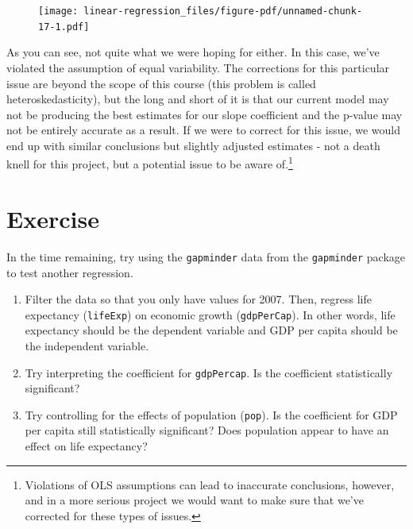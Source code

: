 \documentclass[
  letterpaper,
]{book}
\begin{document}
\begin{figure}[H]

{\centering \texttt{[image: linear-regression\_files/figure-pdf/unnamed-chunk-17-1.pdf]}

}

\end{figure}

As you can see, not quite what we were hoping for either. In this case,
we've violated the assumption of equal variability. The corrections for
this particular issue are beyond the scope of this course (this problem
is called heteroskedasticity), but the long and short of it is that our
current model may not be producing the best estimates for our slope
coefficient and the p-value may not be entirely accurate as a result. If
we were to correct for this issue, we would end up with similar
conclusions but slightly adjusted estimates - not a death knell for this
project, but a potential issue to be aware of.\footnote{Violations of
  OLS assumptions can lead to inaccurate conclusions, however, and in a
  more serious project we would want to make sure that we've corrected
  for these types of issues.}

\hypertarget{exercise-1}{%
\section{Exercise}\label{exercise-1}}

In the time remaining, try using the \texttt{gapminder} data from the
\texttt{gapminder} package to test another regression.

\begin{enumerate}
\def\labelenumi{\arabic{enumi}.}
\item
  Filter the data so that you only have values for 2007. Then, regress
  life expectancy (\texttt{lifeExp}) on economic growth
  (\texttt{gdpPerCap}). In other words, life expectancy should be the
  dependent variable and GDP per capita should be the independent
  variable.
\item
  Try interpreting the coefficient for \texttt{gdpPercap}. Is the
  coefficient statistically significant?
\item
  Try controlling for the effects of population (\texttt{pop}). Is the
  coefficient for GDP per capita still statistically significant? Does
  population appear to have an effect on life expectancy?
\end{enumerate}

\end{document}
